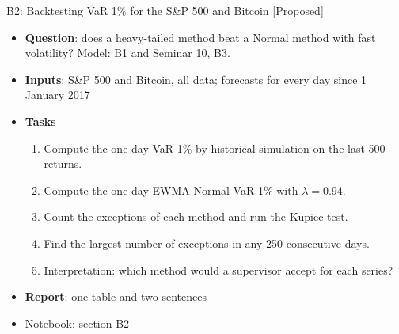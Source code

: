\begin{frame}{B2: Backtesting VaR 1\% for the S\&P 500 and Bitcoin [Proposed]}
\itemsize{\footnotesize}
\begin{itemize}
\item \textbf{Question}: does a heavy-tailed method beat a Normal method with fast volatility? Model: B1 and Seminar 10, B3.
\item \textbf{Inputs}: S\&P 500 and Bitcoin, all data; forecasts for every day since 1 January 2017
\item \textbf{Tasks}
\begin{enumerate}
    \item Compute the one-day VaR 1\% by historical simulation on the last 500 returns.
    \item Compute the one-day EWMA-Normal VaR 1\% with $\lambda = 0.94$.
    \item Count the exceptions of each method and run the Kupiec test.
    \item Find the largest number of exceptions in any 250 consecutive days.
    \item Interpretation: which method would a supervisor accept for each series?
\end{enumerate}
\item \textbf{Report}: one table and two sentences
\item Notebook: section B2
\end{itemize}
\end{frame}

